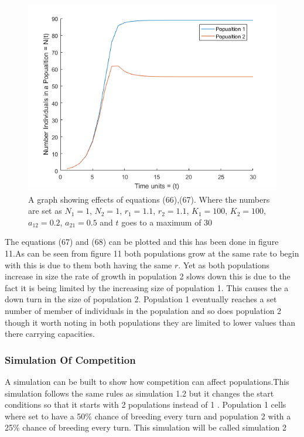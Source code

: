 \documentclass[final]{cmpreport}
\begin{document}
		\begin{figure}[h!] 
			\includegraphics[width=\textwidth]{CompetitionForFood.png}
			\caption{A graph showing effects of equations (66),(67). Where the numbers are set as $N_1=1$, $N_2=1$, $r_1=1.1$, $r_2=1.1$, $K_1=100$, $K_2=100$, $a_{12}=0.2$, $a_{21}=0.5$  and $t$ goes to a maximum of 30
				}
		\end{figure}
		
		The equations (67) and (68)  can be plotted and this has been done in figure 11.As can be seen from figure 11 both populations grow at the same rate to begin with this is due to them both having the same $r$. Yet as both populations increase in size the rate of growth in population 2 slows down this is due to the fact it is being limited by the increasing size of population 1. This causes the a down turn in the size of population 2. Population 1 eventually reaches a set number of member of individuals in the population and so does population 2 though it worth noting in both populations they are limited to lower values than there carrying capacities.
		
	\subsubsection{Simulation Of Competition}
	
		A simulation can be built to show how competition can affect populations.This simulation follows the same rules as simulation 1.2 but it changes the start conditions so that it starts with 2 populations instead of 1 . Population 1 cells where set to have a 50\% chance of breeding every turn and population 2 with a 25\% chance of breeding every turn. This simulation will be called simulation 2 
		
\end{document}
